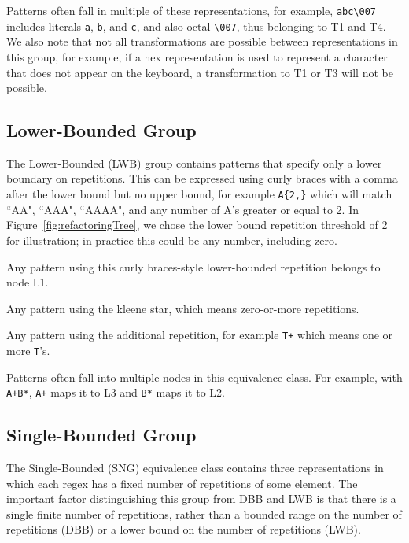 Patterns often fall in multiple of these representations, for example, \verb!abc\007! includes literals \verb!a!, \verb!b!, and \verb!c!, and also octal \verb!\007!, thus belonging to T1 and T4. We also note that 
not all transformations are possible between representations in this group, for example, if a hex representation is used to represent a character that does not appear on the keyboard, a transformation to T1 or T3 will not be possible. 

\subsection{Lower-Bounded Group}
The Lower-Bounded (LWB) group contains patterns that specify only a lower boundary on  repetitions. This can be expressed using curly braces with a comma after the lower bound but no upper bound, for example \verb!A{2,}! which will match ``AA", ``AAA", ``AAAA", and any number of A's greater or equal to 2.  In Figure~\ref{fig:refactoringTree}, we chose the lower bound repetition threshold of  2 for illustration; in practice this could be any number, including zero.


\begin{description}  \itemsep -1pt
\item[L1:] Any pattern using this curly braces-style lower-bounded repetition belongs to node L1.
\item[L2:] Any pattern using the kleene star, which  means zero-or-more repetitions. %
\item[L3:] Any pattern using the additional repetition, for example \verb!T+! which means one or more \verb!T!'s.  
\end{description}

Patterns often fall into multiple nodes in this equivalence class. For example, with \verb!A+B*!,  \verb!A+! maps it to L3 and \verb!B*! maps it to L2. 

\subsection{Single-Bounded Group} 
The Single-Bounded (SNG) equivalence class contains  three representations in which each regex has a fixed number of repetitions of some element. The important factor distinguishing this group from DBB and LWB is that there is a single finite number of repetitions, rather than a bounded range on the number of repetitions (DBB) or a lower bound on the number of repetitions (LWB).


